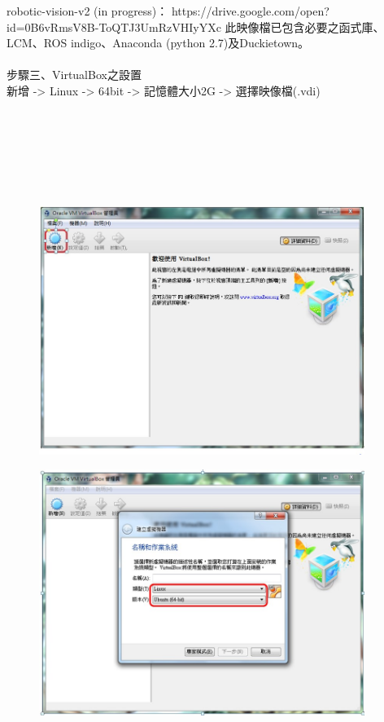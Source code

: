 \documentclass{article}
\begin{document}
robotic-vision-v2 (in progress)：
https://drive.google.com/open?id=0B6vRmsV8B-ToQTJ3UmRzVHIyYXc
此映像檔已包含必要之函式庫、LCM、ROS indigo、Anaconda (python 2.7)及Duckietown。
\\
\\步驟三、VirtualBox之設置
\\新增 -> Linux -> 64bit -> 記憶體大小2G -> 選擇映像檔(.vdi)
\\\\\\\\\\\\\\
\begin{figure}[htp]
    \begin{center}
        \includegraphics[width=300pt]{pic/圖片2.jpg}
    \end{center}
\end{figure}

\begin{figure}[htp]
    \begin{center}
        \includegraphics[width=300pt]{pic/圖片3.jpg}
    \end{center}
\end{figure}
\end{document}
